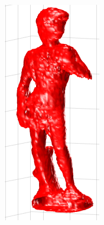 \documentclass[paper=a4, fontsize=11pt]{scrartcl} %
\numberwithin{equation}{section} %
\numberwithin{figure}{section} %
\numberwithin{table}{section} %
\begin{document}
 
\begin{figure}
\centering
\begin{subfigure}{.3\textwidth}
  \centering
  \includegraphics[width=0.9\linewidth]{david_1.png}

\end{subfigure}
\end{figure}
\end{document}
